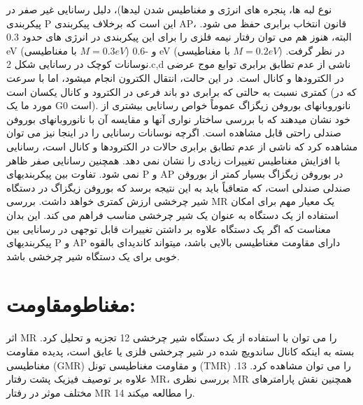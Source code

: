 نوع لبه ها، پنجره های انرژی و مغناطیس شدن لیدها)، دلیل رسانایی غیر صفر در پیکربندی P این است که برخلاف پیکربندی AP، قانون انتخاب برابری حفظ می شود. البته، هنوز هم می توان رفتار نیمه فلزی را برای این پیکربندی در انرژی های حدود 0.3 eV (با مغناطیسی $M = 0.3 eV$) و -0.6 eV (با مغناطیسی $M = 0.2 eV$) در نظر گرفت. نوسانات کوچک در رسانایی شکل 2.c,d ناشی از عدم تطابق برابری توابع موج عرضی در الکترودها و کانال است. در این حالت، انتقال الکترون انجام میشود، اما با سرعت کمتری نسبت به حالتی که برابری دو باند فرعی در الکترود و کانال یکسان است (که در مورد ما یک G0 است). نانوروبانهای بوروفن زیگزاگ عموماً خواص رسانایی بیشتری از خود نشان میدهند که با بررسی ساختار نواری آنها و مقایسه آن با نانوروبانهای بوروفن صندلی راحتی قابل مشاهده است. اگرچه نوسانات رسانایی را در اینجا نیز می توان مشاهده کرد که ناشی از عدم تطابق برابری حالات در الکترودها و کانال است، رسانایی با افزایش مغناطیس تغییرات زیادی را نشان نمی دهد. همچنین رسانایی صفر ظاهر نمی شود. تفاوت بین پیکربندیهای P و AP در بوروفن زیگزاگ بسیار کمتر از بوروفن صندلی صندلی است، که متعاقباً باید به این نتیجه برسد که بوروفن زیگزاگ در دستگاه شیر چرخشی ارزش کمتری خواهد داشت. بررسی MR یک معیار مهم برای امکان استفاده از یک دستگاه به عنوان یک شیر چرخشی مناسب فراهم می کند. این بدان معناست که اگر یک دستگاه علاوه بر داشتن تغییرات قابل توجهی در رسانایی بین پیکربندیهای P و AP دارای مقاومت مغناطیسی بالایی باشد، میتواند کاندیدای بالقوه خوبی برای یک دستگاه شیر چرخشی باشد.

\section{مغناطومقاومت:}
اثر MR را می توان با استفاده از یک دستگاه شیر چرخشی 12 تجزیه و تحلیل کرد. بسته به اینکه کانال ساندویچ شده در شیر چرخشی فلزی یا عایق است، پدیده مقاومت مغناطیسی (GMR) و مقاومت مغناطیسی تونل (TMR) را می توان مشاهده کرد. 13. علاوه بر توصیف فیزیک پشت رفتار MR، بررسی نظری MR همچنین نقش پارامترهای مختلف موثر در رفتار MR 14 را مطالعه میکند.

